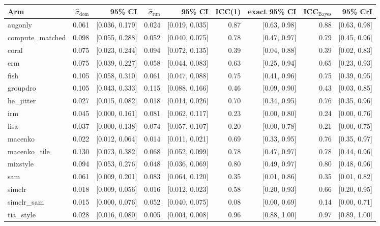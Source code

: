 \begin{tabular}{lrrrrrrrr}
\toprule
Arm & $\hat\sigma_\text{dom}$ & 95\% CI & $\hat\sigma_\text{run}$ & 95\% CI & ICC(1) & exact 95\% CI & ICC$_\text{Bayes}$ & 95\% CrI \\
\midrule
augonly & 0.061 & [0.036, 0.179] & 0.024 & [0.019, 0.035] & 0.87 & [0.63, 0.98] & 0.88 & [0.63, 0.98] \\
compute\_matched & 0.098 & [0.055, 0.288] & 0.052 & [0.040, 0.075] & 0.78 & [0.47, 0.97] & 0.79 & [0.45, 0.96] \\
coral & 0.075 & [0.023, 0.244] & 0.094 & [0.072, 0.135] & 0.39 & [0.04, 0.88] & 0.39 & [0.02, 0.83] \\
erm & 0.075 & [0.039, 0.227] & 0.058 & [0.044, 0.083] & 0.63 & [0.25, 0.94] & 0.65 & [0.23, 0.93] \\
fish & 0.105 & [0.058, 0.310] & 0.061 & [0.047, 0.088] & 0.75 & [0.41, 0.96] & 0.75 & [0.39, 0.95] \\
groupdro & 0.105 & [0.043, 0.333] & 0.115 & [0.088, 0.166] & 0.46 & [0.09, 0.90] & 0.43 & [0.03, 0.85] \\
he\_jitter & 0.027 & [0.015, 0.082] & 0.018 & [0.014, 0.026] & 0.70 & [0.34, 0.95] & 0.76 & [0.35, 0.96] \\
irm & 0.045 & [0.000, 0.161] & 0.081 & [0.062, 0.117] & 0.23 & [0.00, 0.80] & 0.24 & [0.00, 0.76] \\
lisa & 0.037 & [0.000, 0.138] & 0.074 & [0.057, 0.107] & 0.20 & [0.00, 0.78] & 0.21 & [0.00, 0.75] \\
macenko & 0.022 & [0.012, 0.064] & 0.014 & [0.011, 0.021] & 0.69 & [0.33, 0.95] & 0.76 & [0.35, 0.97] \\
macenko\_tile & 0.130 & [0.073, 0.382] & 0.068 & [0.052, 0.099] & 0.78 & [0.47, 0.97] & 0.78 & [0.44, 0.96] \\
mixstyle & 0.094 & [0.053, 0.276] & 0.048 & [0.036, 0.069] & 0.80 & [0.49, 0.97] & 0.80 & [0.48, 0.96] \\
sam & 0.061 & [0.009, 0.201] & 0.083 & [0.064, 0.120] & 0.35 & [0.01, 0.86] & 0.35 & [0.01, 0.82] \\
simclr & 0.018 & [0.009, 0.056] & 0.016 & [0.012, 0.023] & 0.58 & [0.20, 0.93] & 0.66 & [0.20, 0.95] \\
simclr\_sam & 0.015 & [0.000, 0.076] & 0.052 & [0.040, 0.075] & 0.08 & [0.00, 0.69] & 0.14 & [0.00, 0.71] \\
tia\_style & 0.028 & [0.016, 0.080] & 0.005 & [0.004, 0.008] & 0.96 & [0.88, 1.00] & 0.97 & [0.89, 1.00] \\
\bottomrule
\end{tabular}
